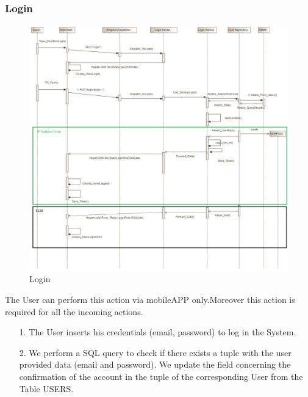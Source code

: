 \documentclass[12pt]{article}
\begin{document}
\subsubsection{Login}
\begin{figure}[h]
	\centering
	\includegraphics[width=\textwidth]{../Images/Sequence_Final/Login}
	\caption{Login}
\end{figure}

The User can perform this action via mobileAPP only.Moreover this action is required for all the incoming actions.
\begin{enumerate}
	\item[1.] The User inserts his credentials (email, password) to log in the System.
	\item[2.] We perform a SQL query to check if there exists a tuple with the user provided data (email and password). We update the field concerning the confirmation of the account in the tuple of the corresponding User from the Table USERS.
\end{enumerate}
\clearpage
\end{document}
